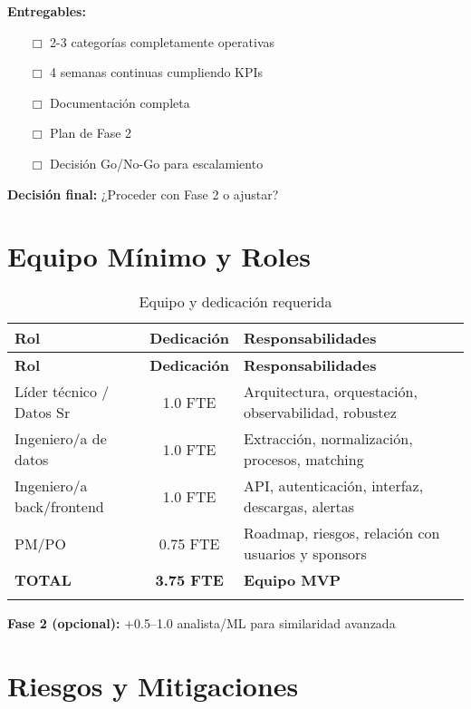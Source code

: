 \documentclass[12pt,a4paper]{article}
\begin{document}
\textbf{Entregables:}
\begin{itemize}[leftmargin=*]
    \item[$\Box$] 2-3 categorías completamente operativas
    \item[$\Box$] 4 semanas continuas cumpliendo KPIs
    \item[$\Box$] Documentación completa
    \item[$\Box$] Plan de Fase 2
    \item[$\Box$] Decisión Go/No-Go para escalamiento
\end{itemize}

\textbf{\textcolor{primaryblue}{Decisión final:}} ¿Proceder con Fase 2 o ajustar?

\section{Equipo Mínimo y Roles}

\begin{longtable}{|p{4cm}|c|p{7cm}|}
\hline
\textbf{Rol} & \textbf{Dedicación} & \textbf{Responsabilidades} \\
\hline
\endfirsthead
\hline
\textbf{Rol} & \textbf{Dedicación} & \textbf{Responsabilidades} \\
\hline
\endhead
Líder técnico / Datos Sr & 1.0 FTE & Arquitectura, orquestación, observabilidad, robustez \\
\hline
Ingeniero/a de datos & 1.0 FTE & Extracción, normalización, procesos, matching \\
\hline
Ingeniero/a back/frontend & 1.0 FTE & API, autenticación, interfaz, descargas, alertas \\
\hline
PM/PO & 0.75 FTE & Roadmap, riesgos, relación con usuarios y sponsors \\
\hline
\textbf{TOTAL} & \textbf{3.75 FTE} & \textbf{Equipo MVP} \\
\hline
\caption{Equipo y dedicación requerida}
\end{longtable}

\textbf{Fase 2 (opcional):} +0.5–1.0 analista/ML para similaridad avanzada

\section{Riesgos y Mitigaciones}
\end{document}
